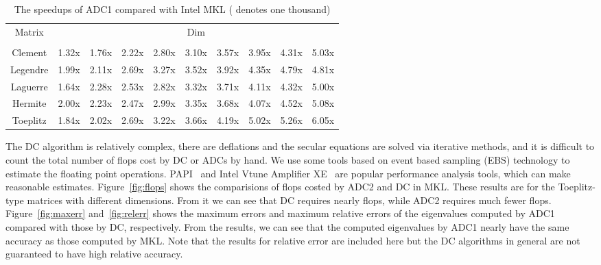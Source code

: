 \documentclass[times]{nlaauth}
\newcounter{algorithm}
\begin{document}
\begin{table}[ptbh]
\caption{The speedups of {ADC1} compared with Intel MKL ( denotes one thousand)}
\label{tab:Ex2-srrsc}
\begin{center}\begin{tabular}
[c]{|c|ccccccccc|}\hline
\multirow{2}{*}{Matrix}  & \multicolumn{9}{c|}{Dim} \\ \cline{2-10}
  &  & &  &  &  &  &  & &   \\ \hline \hline
Clement  & 1.32x & 1.76x & 2.22x & 2.80x & 3.10x & 3.57x & 3.95x & 4.31x & 5.03x   \\
Legendre & 1.99x & 2.11x & 2.69x & 3.27x & 3.52x & 3.92x & 4.35x & 4.79x & 4.81x  \\
Laguerre & 1.64x & 2.28x & 2.53x & 2.82x & 3.32x & 3.71x & 4.11x & 4.32x & 5.00x \\
Hermite  & 2.00x & 2.23x & 2.47x & 2.99x & 3.35x & 3.68x & 4.07x & 4.52x & 5.08x  \\
Toeplitz & 1.84x & 2.02x & 2.69x & 3.22x & 3.66x & 4.19x & 5.02x & 5.26x & 6.05x \\ \hline
\end{tabular}
\end{center}
\end{table}

The DC algorithm is relatively complex, there are deflations and the secular
equations are solved via iterative methods,
and it is difficult to count the total number of flops cost by DC or ADCs by hand.
We use some tools based on event based sampling (EBS) technology to estimate the floating point operations.
PAPI~\cite{papi_web} and Intel Vtune Amplifier XE~\cite{vtune_web} are popular performance analysis tools, which can make reasonable estimates.
Figure~\ref{fig:flops} shows the comparisions of flops costed by ADC2 and DC in MKL.
These results are for the Toeplitz-type matrices with different dimensions.
From it we can see that DC requires nearly  flops, while
ADC2 requires much fewer flops.
Figure~\ref{fig:maxerr} and~\ref{fig:relerr} shows the maximum errors and maximum relative errors of the eigenvalues
computed by ADC1 compared with those by DC, respectively.
From the results, we can see that the computed eigenvalues by ADC1 nearly have the same accuracy as those computed by MKL.
Note that the results for relative error are included here but the DC algorithms in general are
not guaranteed to have high relative accuracy.
\end{document}
